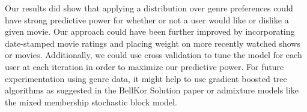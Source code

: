 \documentclass{article} %
\begin{document}
Our results did show that applying a distribution over genre preferences could have strong predictive power for whether or not a user would like or dislike a given movie. Our approach could have been further improved by incorporating date-stamped movie ratings and placing weight on more recently watched shows or movies. Additionally, we could use cross validation to tune the model for each user at each iteration in order to maximize our predictive power. For future experimentation using genre data, it might help to use gradient boosted tree algorithms as suggested in the BellKor Solution paper \cite{bellkor} or admixture models like the mixed membership stochastic block model.



\end{document}
